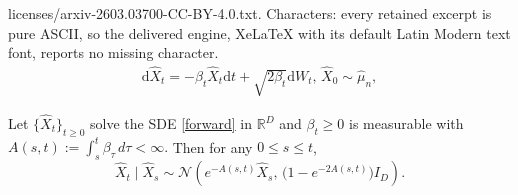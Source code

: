 \documentclass[10pt,a4paper]{amsart}
\newcommand{\diff}{\mathrm{d}}
\newcommand{\hX}{ \widehat{X}}
\newcommand{\hmu}{\hat{\mu}}
\begin{document}
licenses/arxiv-2603.03700-CC-BY-4.0.txt. Characters: every retained excerpt is pure ASCII, so the delivered engine, XeLaTeX with its default Latin Modern text font, reports no missing character.
\begin{align}
    \diff  \hX_t = -\beta_t \hX_t \diff  t + \sqrt{2 \beta_t} \diff  W_t, \, \hX_0 \sim \hmu_n, \label{forward}
\end{align}

\begin{propos}\label{prop_forward_conditional}
Let $\{\hX_t\}_{t\ge 0}$ solve the SDE \eqref{forward} in $\mathbb R^D$ and
$\beta_t \ge 0$ is measurable with
$A(s,t) := \int_s^t \beta_\tau\,d\tau < \infty.$
Then for any $0 \le s \le t$,
\[
\widehat X_t \mid \widehat X_s
\sim
\mathcal N\!\left(
e^{-A(s,t)} \widehat X_s,\,
\big(1-e^{-2A(s,t)}\big) I_D
\right).
\]
\end{propos}
\end{document}
